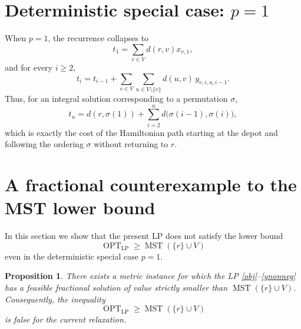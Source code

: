 \documentclass[11pt]{article}
\newtheorem{proposition}{Proposition}
\begin{document}
\section*{Deterministic special case: $p=1$}
When $p=1$, the recurrence collapses to
\[
t_1 = \sum_{v \in V} d(r,v)x_{v,1},
\]
and for every $i \ge 2$,
\[
t_i = t_{i-1} + \sum_{v \in V}\sum_{u \in V \setminus \{v\}} d(u,v)\, y_{v,i,u,i-1}.
\]
Thus, for an integral solution corresponding to a permutation $\sigma$,
\[
t_n = d(r,\sigma(1)) + \sum_{i=2}^n d\bigl(\sigma(i-1),\sigma(i)\bigr),
\]
which is exactly the cost of the Hamiltonian path starting at the depot and following the ordering $\sigma$ without returning to $r$.

\section*{A fractional counterexample to the MST lower bound}
In this section we show that the present LP does not satisfy the lower bound
\[
\operatorname{OPT}_{\mathrm{LP}} \ge \operatorname{MST}(\{r\}\cup V)
\]
even in the deterministic special case $p=1$.

\begin{proposition}
There exists a metric instance for which the LP \eqref{obj}--\eqref{ynonneg} has a feasible fractional solution of value strictly smaller than $\operatorname{MST}(\{r\}\cup V)$. Consequently, the inequality
\[
\operatorname{OPT}_{\mathrm{LP}} \ge \operatorname{MST}(\{r\}\cup V)
\]
is false for the current relaxation.
\end{proposition}
\end{document}

